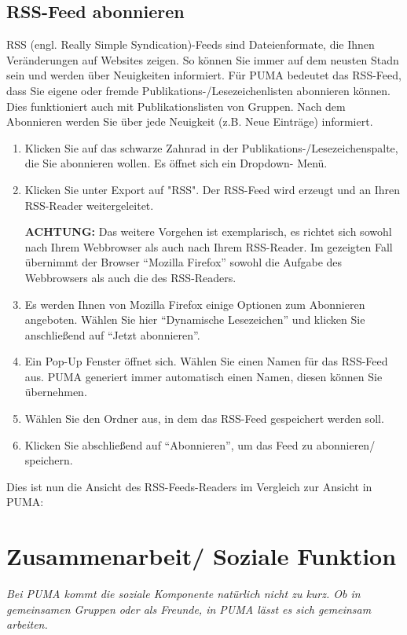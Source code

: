 \documentclass[b5paper,11pt,twoside]{scrbook} %
\begin{document}
\subsection{RSS-Feed abonnieren}
RSS (engl. Really Simple Syndication)-Feeds sind Dateienformate, die Ihnen Veränderungen auf Websites zeigen. So können Sie immer auf dem neusten Stadn sein und werden über Neuigkeiten informiert. Für PUMA bedeutet das RSS-Feed, dass Sie eigene oder fremde Publikations-/Lesezeichenlisten abonnieren können. Dies funktioniert auch mit Publikationslisten von Gruppen. Nach dem Abonnieren werden Sie über jede Neuigkeit (z.B. Neue Einträge) informiert. %
\begin{enumerate}
    \item Klicken Sie auf das schwarze Zahnrad in der Publikations-/Lesezeichenspalte, die Sie abonnieren wollen. Es öffnet sich ein Dropdown- Menü.
    \item  Klicken Sie unter Export auf "RSS". Der RSS-Feed wird erzeugt und an Ihren RSS-Reader weitergeleitet. 
\begin{shaded} \centering
\textbf{ACHTUNG:} Das weitere Vorgehen ist exemplarisch, es richtet sich sowohl nach Ihrem Webbrowser als auch nach Ihrem RSS-Reader. Im gezeigten Fall übernimmt der Browser \enquote{Mozilla Firefox} sowohl die Aufgabe des Webbrowsers als auch die des RSS-Readers.
\end{shaded}
    \item Es werden Ihnen von Mozilla Firefox einige Optionen zum Abonnieren angeboten. Wählen Sie hier \enquote{Dynamische Lesezeichen} und klicken Sie anschließend auf \enquote{Jetzt abonnieren}.
    \item Ein Pop-Up Fenster öffnet sich. Wählen Sie einen Namen für das RSS-Feed aus. PUMA generiert immer automatisch einen Namen, diesen können Sie übernehmen.
    \item Wählen Sie den Ordner aus, in dem das RSS-Feed gespeichert werden soll.
    \item Klicken Sie abschließend auf \enquote{Abonnieren}, um das Feed zu abonnieren/ speichern.
\end{enumerate}
Dies ist nun die Ansicht des RSS-Feeds-Readers im Vergleich zur Ansicht in PUMA:


\newpage
\section{Zusammenarbeit/ Soziale Funktion}
\textit{Bei PUMA kommt die soziale Komponente natürlich nicht zu kurz. Ob in gemeinsamen Gruppen oder als Freunde, in PUMA lässt es sich gemeinsam arbeiten.}
\end{document}
